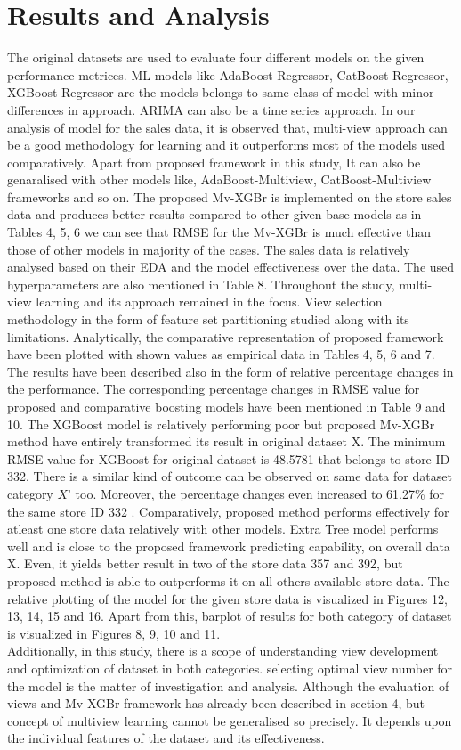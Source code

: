 \section{Results and Analysis}
The original datasets are used to evaluate four different models on the given performance metrices. ML models like AdaBoost Regressor, CatBoost Regressor, XGBoost Regressor are the models belongs to same class of model with minor differences in approach. ARIMA can also be a time series approach.\cite{pavlyshenko2018using} In our analysis of model for the sales data, it is observed that, multi-view approach can be a good methodology for learning and it outperforms most of the models used comparatively. Apart from proposed framework in this study, It can also be genaralised with other models like, AdaBoost-Multiview, CatBoost-Multiview frameworks and so on. The proposed Mv-XGBr is implemented on the store sales data and produces better results compared to other given base models as in Tables 4, 5, 6 we can see that RMSE for the Mv-XGBr is much effective than those of other models in majority of the cases. The sales data is relatively analysed based on their EDA and the model effectiveness over the data. The used hyperparameters are also mentioned in Table 8. Throughout the study, multi-view learning and its approach remained in the focus. View selection methodology in the form of feature set partitioning studied along with its limitations. Analytically, the comparative representation of proposed framework have been plotted with shown values as empirical data in Tables 4, 5, 6 and 7. The results have been described also in the form of relative percentage changes in the performance. The corresponding percentage changes in RMSE value for proposed and comparative boosting models have been mentioned in Table 9 and 10. The XGBoost model is relatively performing poor but proposed Mv-XGBr method have entirely transformed its result in original dataset X. The minimum RMSE value for XGBoost for original dataset is 48.5781 that belongs to store ID 332. There is a similar kind of outcome can be observed on same data for dataset category $X’$ too. Moreover, the percentage changes even increased to 61.27\% for the same store ID 332  . Comparatively, proposed method performs effectively for atleast one store data relatively with other models. Extra Tree model performs well and is close to the proposed framework predicting capability, on overall data X. Even, it yields better result in two of the store data 357 and  392, but proposed method is able to outperforms it on all others available store data. The relative plotting of the model for the given store data is visualized in Figures 12, 13, 14, 15 and 16. Apart from this, barplot of results for both category of dataset is visualized in Figures 8, 9, 10 and 11. \\
Additionally, in this study, there is a scope of understanding view development and optimization of dataset in both categories. selecting optimal view number for the model is the matter of investigation and analysis. Although the evaluation of views and Mv-XGBr framework has already been described in section 4, but concept of multiview learning cannot be generalised so precisely. It depends upon the individual features of the dataset and its effectiveness.


